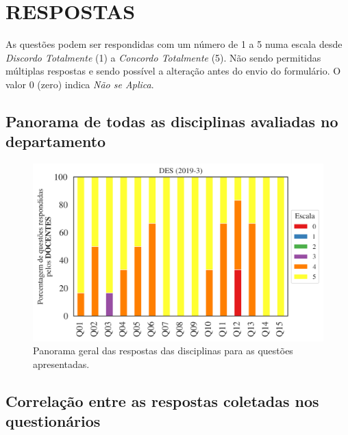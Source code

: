 \documentclass[a4paper,10pt]{article}
\begin{document}
\section{RESPOSTAS}
As questões podem ser respondidas com um número de 1 a 5 numa escala desde {\it Discordo Totalmente} (1) a {\it Concordo Totalmente} (5). Não sendo permitidas múltiplas respostas e sendo possível a alteração antes do envio do formulário. O valor 0 (zero) indica {\it Não se Aplica}.

\subsection{Panorama de todas as disciplinas avaliadas no departamento}
\begin{figure}[h]
\centering
\includegraphics[width=0.85\linewidth]{analise_geral_departamento_DES_docentes.png}
\caption{\label{fig:analise_geral_departamento}            Panorama geral das respostas das disciplinas para as questões apresentadas.}
\end{figure}
\subsection{Correlação entre as respostas coletadas nos questionários}
\end{document}
